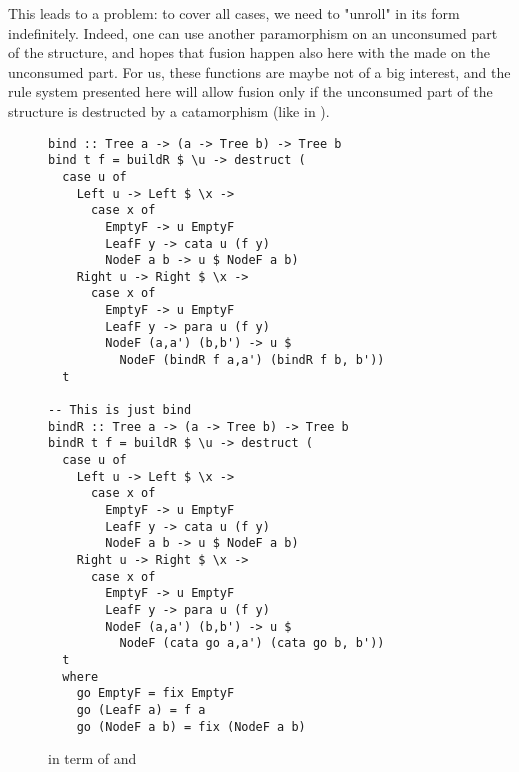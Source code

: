 This leads to a problem: to cover all cases, we need to "unroll"  in its  form indefinitely. Indeed, one can use another paramorphism on an unconsumed part of the structure, and hopes that fusion happen also here with the  made on the unconsumed part. For us, these functions are maybe not of a big interest, and the rule system presented here will allow fusion only if the unconsumed part of the structure is destructed by a catamorphism (like in ).

\begin{figure}
\begin{verbatim}
bind :: Tree a -> (a -> Tree b) -> Tree b
bind t f = buildR $ \u -> destruct (
  case u of
    Left u -> Left $ \x ->
      case x of
        EmptyF -> u EmptyF
        LeafF y -> cata u (f y)
        NodeF a b -> u $ NodeF a b)
    Right u -> Right $ \x ->
      case x of
        EmptyF -> u EmptyF
        LeafF y -> para u (f y)
        NodeF (a,a') (b,b') -> u $
          NodeF (bindR f a,a') (bindR f b, b'))
  t

-- This is just bind
bindR :: Tree a -> (a -> Tree b) -> Tree b
bindR t f = buildR $ \u -> destruct (
  case u of
    Left u -> Left $ \x ->
      case x of
        EmptyF -> u EmptyF
        LeafF y -> cata u (f y)
        NodeF a b -> u $ NodeF a b)
    Right u -> Right $ \x ->
      case x of
        EmptyF -> u EmptyF
        LeafF y -> para u (f y)
        NodeF (a,a') (b,b') -> u $
          NodeF (cata go a,a') (cata go b, b'))
  t
  where
    go EmptyF = fix EmptyF
    go (LeafF a) = f a
    go (NodeF a b) = fix (NodeF a b)

\end{verbatim}
\caption{ in term of  and }
\label{fig:bindbuild}
\end{figure}

